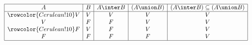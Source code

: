\begin{enumerate}[label=\arabic*)]
        $$\begin{array}{|c|c|c|c|c|}
            \hline
            A & B & A \inter B & (A \union B) & (A \inter B) \subseteq (A \union B) \\ \hline\rowcolor{Cerulean!10}
            V & V & V          & V            & V                                   \\
            V & F & F          & V            & V                                   \\\rowcolor{Cerulean!10}
            F & V & F          & V            & V                                   \\
            F & F & F          & F            & V                                   \\ \hline
          \end{array}
        $$
\end{enumerate}

\begin{aportes}
  \item {}
\end{aportes}

